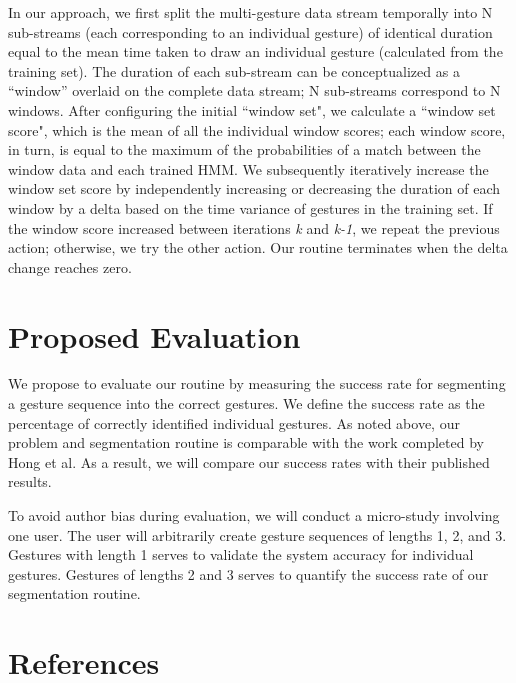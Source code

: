 \documentclass[twoside]{article}
\begin{document}
\begin{multicols}{2}
In our approach, we first split the multi-gesture data stream temporally into N
sub-streams (each corresponding to an individual gesture) of identical duration
equal to the mean time taken to draw an individual gesture (calculated from the
training set). The duration of each sub-stream can be conceptualized as a
``window'' overlaid on the complete data stream; N sub-streams correspond to N
windows. After configuring the initial ``window set", we calculate a ``window
set score", which is the mean of all the individual window scores; each window
score, in turn, is equal to the maximum of the probabilities of a match between
the window data and each trained HMM. We subsequently iteratively increase the
window set score by independently increasing or decreasing the duration of each
window by a delta based on the time variance of gestures in the training set. If
the window score increased between iterations \emph{k} and \emph{k-1}, we repeat
the previous action; otherwise, we try the other action. Our routine terminates
when the delta change reaches zero.

\section{Proposed Evaluation}

We propose to evaluate our routine by measuring the success rate for segmenting
a gesture sequence into the correct gestures. We define the success rate as the
percentage of correctly identified individual gestures. As noted above, our problem
and segmentation routine is comparable with the work completed by Hong et
al\cite{hong1998segmentation}. As a result, we will compare our success rates
with their published results.

To avoid author bias during evaluation, we will conduct a micro-study involving
one user. The user will arbitrarily create gesture sequences of
lengths 1, 2, and 3. Gestures with length 1 serves to validate the system
accuracy for individual gestures. Gestures of lengths 2 and 3 serves to quantify
the success rate of our segmentation routine.

\section{References}

\begin{spacing}{0.9}
%
\begingroup
\renewcommand{\section}[2]{}%

\endgroup
\end{spacing}

\end{multicols}
\end{document}
